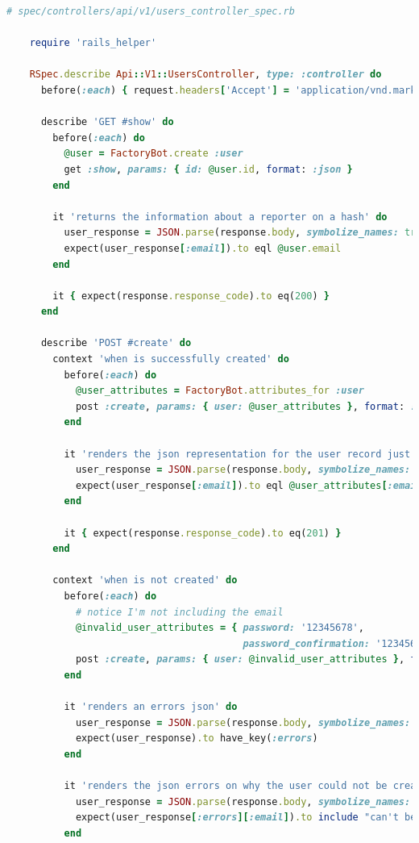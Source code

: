 \documentclass[]{report}
\begin{document}
  \begin{scriptsize}
    \begin{lstlisting}[language=ruby, caption={Le fichier de test du contrôlleur avant la refactorisation}, label={lst:users_controller_spec_before_factorization}]
    # spec/controllers/api/v1/users_controller_spec.rb

    require 'rails_helper'

    RSpec.describe Api::V1::UsersController, type: :controller do
      before(:each) { request.headers['Accept'] = 'application/vnd.marketplace.v1' }

      describe 'GET #show' do
        before(:each) do
          @user = FactoryBot.create :user
          get :show, params: { id: @user.id, format: :json }
        end

        it 'returns the information about a reporter on a hash' do
          user_response = JSON.parse(response.body, symbolize_names: true)
          expect(user_response[:email]).to eql @user.email
        end

        it { expect(response.response_code).to eq(200) }
      end

      describe 'POST #create' do
        context 'when is successfully created' do
          before(:each) do
            @user_attributes = FactoryBot.attributes_for :user
            post :create, params: { user: @user_attributes }, format: :json
          end

          it 'renders the json representation for the user record just created' do
            user_response = JSON.parse(response.body, symbolize_names: true)
            expect(user_response[:email]).to eql @user_attributes[:email]
          end

          it { expect(response.response_code).to eq(201) }
        end

        context 'when is not created' do
          before(:each) do
            # notice I'm not including the email
            @invalid_user_attributes = { password: '12345678',
                                         password_confirmation: '12345678' }
            post :create, params: { user: @invalid_user_attributes }, format: :json
          end

          it 'renders an errors json' do
            user_response = JSON.parse(response.body, symbolize_names: true)
            expect(user_response).to have_key(:errors)
          end

          it 'renders the json errors on why the user could not be created' do
            user_response = JSON.parse(response.body, symbolize_names: true)
            expect(user_response[:errors][:email]).to include "can't be blank"
          end


\end{lstlisting}
\end{scriptsize}
\end{document}
